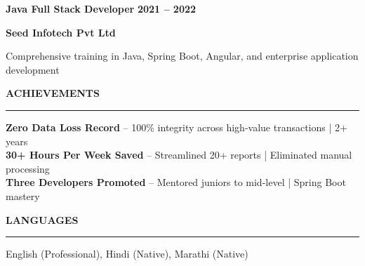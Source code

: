 \documentclass[8pt,a4paper,withhyper]{altacv}
\renewcommand{\cvsectionfont}{\large\rmfamily\bfseries}
\renewcommand{\cvevent}[4]{%
  {\large\color{emphasis}\textbf{#1}} \ifstrequal{#3}{}{}{\hfill {\normalsize\textbf{\color{accent}#3}}} \par
  \vspace{2pt}
  \ifstrequal{#2}{}{}{%
    {\normalsize\textbf{\color{body}#2}} \ifstrequal{#4}{}{}{\hfill {\normalsize\color{body}#4}} \par
  }%
  \vspace{4pt}\normalsize
}
\renewcommand{\cvsection}[2][]{%
  \nointerlineskip\bigskip%
  {\color{heading}\cvsectionfont\MakeUppercase{#2}}\\[-1ex]%
  {\color{headingrule}\rule{\linewidth}{1.2pt}\par}\medskip
}
\begin{document}
\vspace{4pt}{\color{body!30}\hrule}\vspace{4pt}

\cvevent{Java Full Stack Developer}{Seed Infotech Pvt Ltd}{2021 -- 2022}{}
Comprehensive training in Java, Spring Boot, Angular, and enterprise application development

\cvsection{Achievements}
\vspace{-2pt}

\textbf{Zero Data Loss Record} -- 100\% integrity across high-value transactions | 2+ years\\[2pt]
\textbf{30+ Hours Per Week Saved} -- Streamlined 20+ reports | Eliminated manual processing\\[2pt]
\textbf{Three Developers Promoted} -- Mentored juniors to mid-level | Spring Boot mastery

\smallskip
\cvsection{Languages}
\vspace{-2pt}

English (Professional), Hindi (Native), Marathi (Native)
\end{document}
